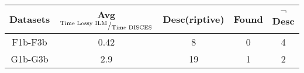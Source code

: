 \begin{tabular}{ c c c c c}
\toprule
Datasets & Avg ${}^{\text{Time Lossy ILM}}/_{\text{Time \sys{}}}$ &
{Desc}(riptive) & Found &
$\neg$
{Desc}\\
\midrule
F1b-F3b & 0.42 & 8 & 0 & 4\\
G1b-G3b & 2.9 & 19 & 1 & 2 \\
\bottomrule
\end{tabular}
